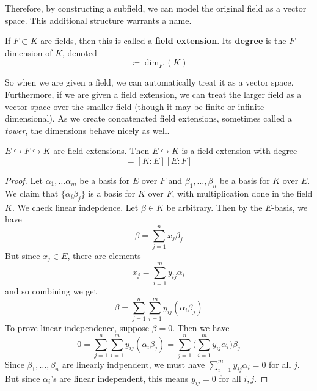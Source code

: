   Therefore, by constructing a subfield, we can model the original field as a vector space. This additional structure warrants a name. 

  \begin{definition}
    If $F \subset K$ are fields, then this is called a \textbf{field extension}. Its \textbf{degree} is the $F$-dimension of $K$, denoted
    \begin{equation}
      [K:F] \coloneqq \dim_F (K) 
    \end{equation}
  \end{definition} 

  So when we are given a field, we can automatically treat it as a vector space. Furthermore, if we are given a field extension, we can treat the larger field as a vector space over the smaller field (though it may be finite or infinite-dimensional). As we create concatenated field extensions, sometimes called a \textit{tower}, the dimensions behave nicely as well. 

  \begin{theorem}
    $E \hookrightarrow F \hookrightarrow K$ are field extensions. Then $E \hookrightarrow K$ is a field extension with degree 
    \begin{equation}
      [K:E] = [K:E] [E:F]
    \end{equation}
  \end{theorem}
  \begin{proof}
    Let $\alpha_1, \ldots \alpha_m$ be a basis for $E$ over $F$ and $\beta_1, \ldots, \beta_n$ be a basis for $K$ over $E$. We claim that $\{\alpha_i \beta_j\}$ is a basis for $K$ over $F$, with multiplication done in the field $K$. We check linear indepdence. Let $\beta \in K$ be arbitrary. Then by the $E$-basis, we have 
    \begin{equation}
      \beta = \sum_{j=1}^n x_j \beta_j
    \end{equation} 
    But since $x_j \in E$, there are elements 
    \begin{equation}
      x_j = \sum_{i=1}^m y_{ij} \alpha_i
    \end{equation}
    and so combining we get 
    \begin{equation}
      \beta = \sum_{j=1}^n \sum_{i=1}^m y_{ij} (\alpha_i \beta_j) 
    \end{equation}
    To prove linear independence, suppose $\beta = 0$. Then we have 
    \begin{equation}
      0 = \sum_{j=1}^n \sum_{i=1}^m y_{ij} (\alpha_i \beta_j) = \sum_{j=1}^n \bigg( \sum_{i=1}^m y_{ij} \alpha_i \bigg) \beta_j 
    \end{equation}
    Since $\beta_1, \ldots, \beta_n$ are linearly indpendent, we must have $\sum_{i=1}^m y_{ij} \alpha_i = 0$ for all $j$. But since $\alpha_i$'s are linear independent, this means $y_{ij} = 0$ for all $i, j$. 
  \end{proof} 

